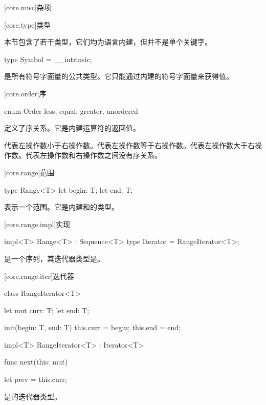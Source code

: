 
[core.misc]{杂项}

[core.type]{类型}

\pnum
本节包含了若干类型，它们均为语言内建，但并不是单个关键字。

\begin{itemdecl}
type Symbol = __intrinsic;
\end{itemdecl}

\pnum
{}是所有符号字面量的公共类型。它只能通过内建的符号字面量来获得值。

[core.order]{序}

\begin{itemdecl}
enum Order {
    less,
    equal,
    greater,
    unordered
}
\end{itemdecl}

\pnum
{}定义了序关系。它是内建运算符的返回值。

\pnum
{}代表左操作数小于右操作数。代表左操作数等于右操作数。代表左操作数大于右操作数。代表左操作数和右操作数之间没有序关系。

[core.range]{范围}

\begin{itemdecl}
type Range<T> {
    let begin: T;
    let end: T;
}
\end{itemdecl}

\pnum
{}表示一个范围。它是内建和的类型。

[core.range.impl]{实现}

\begin{itemdecl}
impl<T> Range<T> : Sequence<T> {
    type Iterator = RangeIterator<T>;
}
\end{itemdecl}

\pnum
{}是一个序列，其迭代器类型是。

[core.range.iter]{迭代器}

\begin{itemdecl}
class RangeIterator<T> {
    let mut curr: T;
    let end: T;

    init(begin: T, end: T) {
        this.curr = begin;
        this.end = end;
    }
}

impl<T> RangeIterator<T> : Iterator<T> {
    func next(this: mut) {


        let prev = this.curr;
    }
}
\end{itemdecl}

\pnum
{}是的迭代器类型。